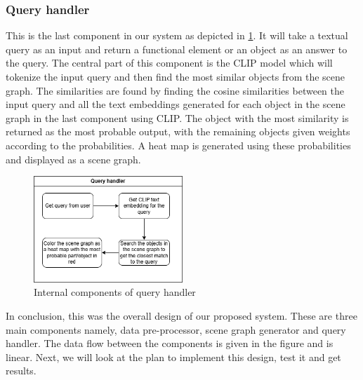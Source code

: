 \subsubsection{Query handler}
This is the last component in our system as depicted in \cref{fig:queryHandler}. It will take a textual query as an input and return a functional element or an object as an answer to the query. The central
part of this component is the CLIP model which will tokenize the input query and then find the most similar objects from the scene graph. The similarities are found 
by finding the cosine similarities between the input query and all the text embeddings generated for each object in the scene graph in the last component using CLIP.
The object with the most similarity is returned as the most probable output, with the remaining objects given weights according to the probabilities. A heat map is 
generated using these probabilities and displayed as a scene graph.\\
\begin{figure}[ht!]
    \centering
    \includegraphics[width=0.5\textwidth]{content/images/QueryHandler.png}
    \caption{Internal components of query handler}
    \label{fig:queryHandler}
\end{figure}

In conclusion, this was the overall design of our proposed system. These are three main components namely, data pre-processor, scene graph generator and query handler. 
The data flow between the components is given in the figure and is linear. Next, we will look at the plan to implement this design, test it and get results.
